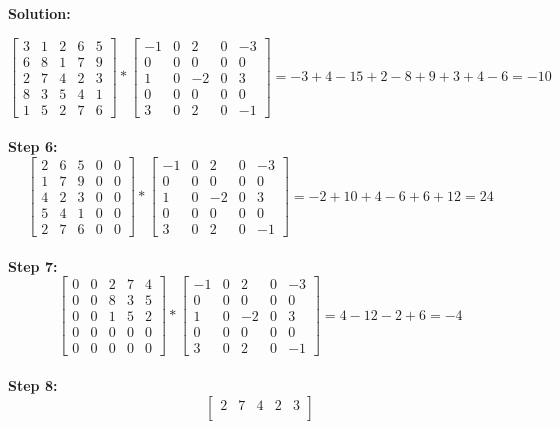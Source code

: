 \documentclass{article}
\newenvironment{solution}
  {\par\noindent\textbf{Solution:}\par}
  {\par}
\begin{document}
\begin{solution}
\[\begin{bmatrix}
3 & 1 & 2 & 6 & 5  \\
6 & 8 & 1 & 7 & 9 \\
2 & 7 & 4 & 2 & 3 \\
8 & 3 & 5 & 4 & 1 \\
1 & 5 & 2 & 7 & 6
\end{bmatrix} *  \begin{bmatrix}
-1 & 0 & 2 & 0 & -3  \\
0 & 0 & 0 & 0 & 0 \\
1 & 0 & -2 & 0 & 3 \\
0 & 0 & 0 & 0 & 0 \\
3 & 0 & 2 & 0 & -1
\end{bmatrix} = -3 +4 -15 +2 -8 +9 +3 +4 -6 = -10
\]
\\ 
\textbf{Step 6:} 
\[
  \begin{bmatrix}
2 & 6 & 5 & 0 & 0 \\
1 & 7 & 9 & 0 & 0 \\
4 & 2 & 3 & 0 & 0 \\
5 & 4 & 1 & 0 & 0 \\
2 & 7 & 6 & 0 & 0
\end{bmatrix} * \begin{bmatrix}
-1 & 0 & 2 & 0 & -3  \\
0 & 0 & 0 & 0 & 0 \\
1 & 0 & -2 & 0 & 3 \\
0 & 0 & 0 & 0 & 0 \\
3 & 0 & 2 & 0 & -1
\end{bmatrix} = -2 + 10 +4 -6 +6 +12 =24
\]
\\ 
\textbf{Step 7:} 
\[
\begin{bmatrix}
0 & 0 & 2 & 7 & 4 \\
0 & 0 & 8 & 3 & 5 \\
0 & 0 & 1 & 5 & 2 \\
0 & 0 & 0 & 0 & 0 \\
0 & 0 & 0 & 0 & 0
\end{bmatrix} * \begin{bmatrix}
-1 & 0 & 2 & 0 & -3  \\
0 & 0 & 0 & 0 & 0 \\
1 & 0 & -2 & 0 & 3 \\
0 & 0 & 0 & 0 & 0 \\
3 & 0 & 2 & 0 & -1
\end{bmatrix} = 4 -12 -2 + 6 = -4
\]
\\ 
\textbf{Step 8:} 
\[
\begin{bmatrix}
2 & 7 & 4 & 2 & 3 \\

\end{bmatrix}\]
\end{solution}
\end{document}
